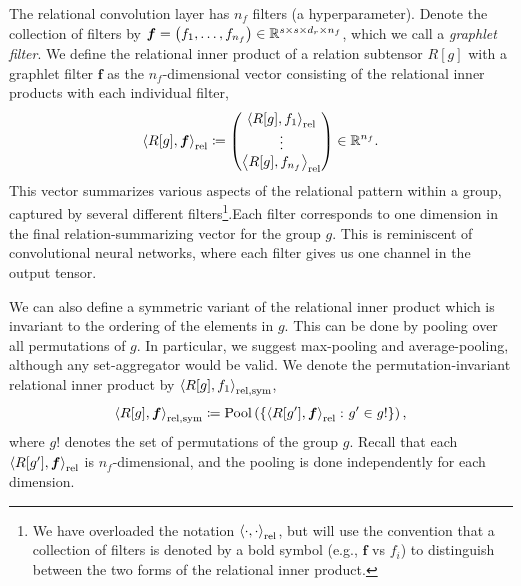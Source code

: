 The relational convolution layer has $n_f$ filters (a hyperparameter). Denote the collection of filters by $\boldsymbol{f} = \left(f_1, \ldots, f_{n_f}\right) \in \mathbb{R}^{s \times s \times d_r \times n_f}$, which we call a \textit{graphlet filter}. We define the relational inner product of a relation subtensor $R[g]$ with a graphlet filter $\bm{f}$ as the $n_f$-dimensional vector consisting of the relational inner products with each individual filter,
\begin{equation}
    \label{eq:relational_inner_prod}
    \left\langle R[g], \bm{f} \right\rangle_\mathrm{rel} \coloneq \begin{pmatrix} \left\langle R[g], f_1 \right\rangle_\mathrm{rel} \\ \vdots 
 \\ \left\langle R[g], f_{n_f} \right\rangle_\mathrm{rel} \end{pmatrix} \in \mathbb{R}^{n_f}.
\end{equation}
This vector summarizes various aspects of the relational pattern within a group, captured by several different filters\footnote{We have overloaded the notation $\left\langle \cdot, \cdot \right\rangle_\mathrm{rel}$, but will use the convention that a collection of filters is denoted by a bold symbol (e.g., $\bm{f}$ vs $f_i$) to distinguish between the two forms of the relational inner product.}.Each filter corresponds to one dimension in the final relation-summarizing vector for the group $g$. This is reminiscent of convolutional neural networks, where each filter gives us one channel in the output tensor.

We can also define a symmetric variant of the relational inner product which is invariant to the ordering of the elements in $g$. This can be done by pooling over all permutations of $g$. In particular, we suggest max-pooling and average-pooling, although any set-aggregator would be valid. We denote the permutation-invariant relational inner product by $\left \langle R[g], f_1 \right\rangle_{\mathrm{rel}, \mathrm{sym}}$,
\begin{equation}\label{eq:symmetric_relational_inner_prod}
    \left \langle R[g], \bm{f} \right\rangle_{\mathrm{rel}, \mathrm{sym}} \coloneq \mathrm{Pool}\left(\left\{\left\langle R[g'], \bm{f} \right\rangle_\mathrm{rel} \colon g' \in g!\right\}\right),
\end{equation}
\noindent where $g!$ denotes the set of permutations of the group $g$. Recall that each $\left \langle R[g'], \bm{f} \right\rangle_{\mathrm{rel}}$ is $n_f$-dimensional, and the pooling is done independently for each dimension.

